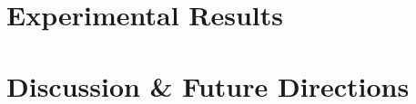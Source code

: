 \documentclass[a4paper, oneside, 11pt]{report} %
\begin{document}

\newpage


\part{Experimental Results}

\newpage


\newpage

\part{Discussion \& Future Directions}

\newpage



\newpage
\end{document}
